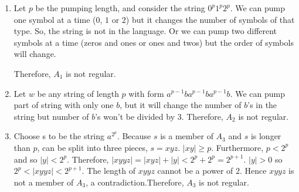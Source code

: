 \begin{enumerate}
          \begin{enumerate}
              \item Let $p$ be the pumping length, and consider the string $0^p 1^p 2^p$. We can pump one symbol at a time ($0$, $1$ or $2$) but it changes the number of symbols of that type. So, the string is not in the language. Or we can pump two different symbols at a time (zeros and ones or ones and twos) but the order of symbols will change.

                    Therefore, $A_1$ is not regular.

              \item Let $w$ be any string of length $p$ with form $a^{p-1}ba^{p-1}ba^{p-1}b$. We can pump part of string with only one $b$, but it will change the number of $b$'s in the string but number of $b$'s won't be divided by 3. Therefore, $A_2$ is not regular.

              \item Choose s to be the string $a^{2^p}$. Because $s$ is a member of $A_3$ and $s$ is longer than $p$, can be split into three pieces, $s = xyz$. $|xy|\geq p$. Furthermore, $p < 2^p$ and so $|y| < 2^p$. Therefore, $|xyyz| = |xyz|+|y| < 2^p+2^p =2^{p+1}$. $|y| > 0$ so $2^p < |xyyz| < 2^{p+1}$. The length of $xyyz$ cannot be a power of $2$. Hence $xyyz$ is not a member of $A_3$, a contradiction.Therefore, $A_3$ is not regular.
          \end{enumerate}
\end{enumerate}

